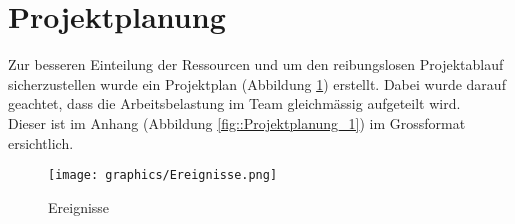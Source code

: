 \section{Projektplanung}

Zur besseren Einteilung der Ressourcen und um den reibungslosen Projektablauf sicherzustellen wurde ein Projektplan (Abbildung \ref{fig::Ereignisse}) erstellt. 
Dabei wurde darauf geachtet, dass die Arbeitsbelastung im Team gleichmässig aufgeteilt wird.\\
Dieser ist im Anhang (Abbildung \ref{fig::Projektplanung_1}) im Grossformat ersichtlich.


\begin{figure}[h] 
\centering
\texttt{[image: graphics/Ereignisse.png]}%
\caption{Ereignisse}%
\label{fig::Ereignisse}%
\end{figure}
